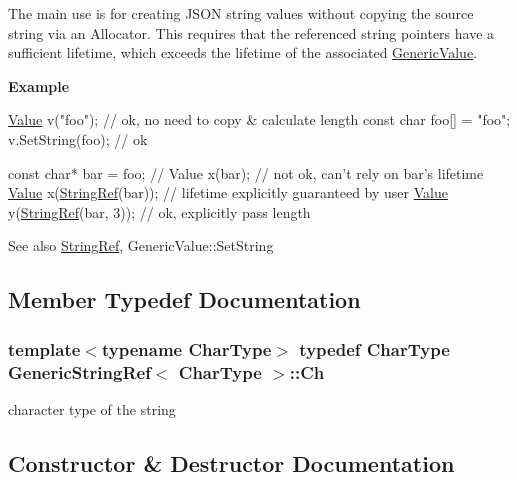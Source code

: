 The main use is for creating J\+S\+ON string values without copying the source string via an Allocator. This requires that the referenced string pointers have a sufficient lifetime, which exceeds the lifetime of the associated \hyperlink{classGenericValue}{Generic\+Value}.

{\bfseries Example} 
\begin{DoxyCode}
\hyperlink{classGenericValue}{Value} v(\textcolor{stringliteral}{"foo"});   \textcolor{comment}{// ok, no need to copy & calculate length}
\textcolor{keyword}{const} \textcolor{keywordtype}{char} foo[] = \textcolor{stringliteral}{"foo"};
v.SetString(foo); \textcolor{comment}{// ok}

\textcolor{keyword}{const} \textcolor{keywordtype}{char}* bar = foo;
\textcolor{comment}{// Value x(bar); // not ok, can't rely on bar's lifetime}
\hyperlink{classGenericValue}{Value} x(\hyperlink{structGenericStringRef_aa6b9fd9f6aa49405a574c362ba9af6b5}{StringRef}(bar)); \textcolor{comment}{// lifetime explicitly guaranteed by user}
\hyperlink{classGenericValue}{Value} y(\hyperlink{structGenericStringRef_aa6b9fd9f6aa49405a574c362ba9af6b5}{StringRef}(bar, 3));  \textcolor{comment}{// ok, explicitly pass length}
\end{DoxyCode}


\begin{DoxySeeAlso}{See also}
\hyperlink{structGenericStringRef_aa6b9fd9f6aa49405a574c362ba9af6b5}{String\+Ref}, Generic\+Value\+::\+Set\+String 
\end{DoxySeeAlso}


\subsection{Member Typedef Documentation}
\subsubsection[{\texorpdfstring{Ch}{Ch}}]{\setlength{\rightskip}{0pt plus 5cm}template$<$typename Char\+Type$>$ typedef Char\+Type {\bf Generic\+String\+Ref}$<$ Char\+Type $>$\+::{\bf Ch}}\hypertarget{structGenericStringRef_a16908c3fce41be380061330c14ba2140}{}\label{structGenericStringRef_a16908c3fce41be380061330c14ba2140}


character type of the string 



\subsection{Constructor \& Destructor Documentation}
